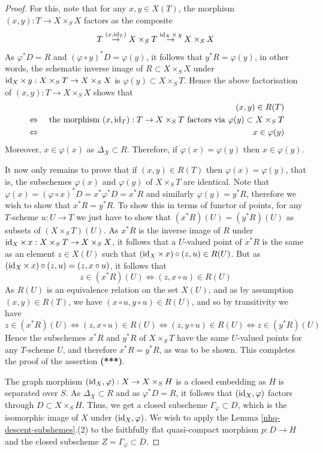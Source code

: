 \begin{proof}
\medskip


For this, note that for any $x,y\in X(T)$, the morphism
$(x,y): T \to X\times_SX$  factors as the composite
$$T \stackrel{(x,\operatorname{id}_T)}{\to}X\times_S T
\stackrel{\operatorname{id}_X \times\, y}{\to}  X\times_S X$$
As $\varphi^*D = R$ and $(\varphi\circ y)^*D = \varphi(y)$,
it follows that $y^*R =  \varphi(y)$, in other words,
the schematic inverse image of $R\subset X\times_S X$ under
$\operatorname{id}_X\times\, y : X\times_S T \to X\times_S X$
is $\varphi(y)\subset X\times_S T$. Hence the above factorisation
of $(x,y) : T\to X\times_SX$ shows that
\begin{eqnarray*}
&& (x,y) \in R(T) \\
& \Leftrightarrow
& \mbox{~the~morphism~} (x,\operatorname{id}_T):T \to X\times_ST
  \mbox{~factors~via~} \varphi(y)\subset X\times_ST \\
& \Leftrightarrow & x \in \varphi(y)
\end{eqnarray*}
Moreover, $x \in \varphi(x)$ as $\Delta_X \subset R$.
Therefore, if $\varphi(x) = \varphi(y)$ then
$x \in \varphi(y)$.

It now only remains to prove that
if $(x,y) \in R(T)$ then $\varphi(x) = \varphi(y)$,
that is, the subschemes
$\varphi(x)$ and $\varphi(y)$ of $X\times_S T$ are identical.
Note that
$\varphi(x) = (\varphi\circ x)^*D = x^*\varphi^*D =
x^*R$ and similarly $\varphi(y) = y^*R$, therefore
we wish to show that $x^*R  = y^*R$. To show this
in terms of functor of points, for any $T$-scheme $u: U \to T$
we just have to show that
$(x^*R)(U) = (y^*R)(U)$ as subsets of $(X\times_ST)(U)$.
As $x^*R$ is the inverse image of $R$ under
$\operatorname{id}_X\times\, x : X\times_ST \to X\times_SX$, it follows that
a $U$-valued point of $x^*R$ is the same as
an element $z\in X(U)$
such that $(\operatorname{id}_X\times\, x)\circ (z,u) \in R(U)$.
But as $(\operatorname{id}_X\times\, x)\circ (z,u) = (z, x\circ u)$, it follows that
$$z \in (x^*R)(U) \Leftrightarrow (z, x\circ u) \in R(U)$$
As $R(U)$ is an equivalence relation on the set $X(U)$, and
as by assumption $(x,y) \in R(T)$, we have
$(x\circ u, y\circ u) \in R(U)$, and so by transitivity
we have
$$z \in (x^*R)(U) \Leftrightarrow (z, x\circ u) \in R(U)
\Leftrightarrow (z, y\circ u) \in R(U)
\Leftrightarrow z \in (y^*R)(U)$$
Hence the subschemes $x^*R$ and $y^*R$ of $X\times_ST$
have the same $U$-valued points
for any $T$-scheme $U$, and therefore $x^*R = y^*R$, as was to be shown.
This completes the proof of the assertion \textbf{(***)}.






The graph morphism $(\operatorname{id}_X, {\varphi}) : X \to X\times_S H$
is a closed embedding as $H$ is separated over $S$.
As $\Delta_X \subset R$ and as
${\varphi}^* D = R$, it follows that
$(\operatorname{id}_X, {\varphi})$ factors through $D\subset X\times_SH$.
Thus, we get a closed subscheme $\Gamma_{\varphi} \subset D$,
which is the isomorphic image of $X$ under
$(\operatorname{id}_X, {\varphi})$. We wish to apply the
Lemma \ref{nhq-descent-subshemes}.(2)
to the faithfully flat quasi-compact morphism
$p: D \to H$ and the closed subscheme $Z = \Gamma_{\varphi} \subset D$.


\end{proof}
